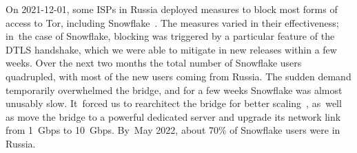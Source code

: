 \documentclass[letterpaper,twocolumn]{article}
\begin{document}
On \mbox{2021-12-01}, some ISPs in Russia
deployed measures to block
most forms of access to Tor,
including Snowflake~\cite{ooni-2021-russia-blocks-tor}.
The measures varied in their effectiveness;
in~the case of Snowflake,
blocking was triggered by a particular feature of the DTLS handshake,
which we were able to mitigate in new releases within a few weeks.
Over the next two months the total number of Snowflake users quadrupled,
with most of the new users coming from Russia.
The sudden demand temporarily overwhelmed the bridge, and
for a few weeks Snowflake was almost unusably slow.
It~forced us to rearchitect the bridge for better scaling~\cite{Fifield2023a},
as~well as move the bridge to a powerful dedicated server
and upgrade its network link from 1~Gbps to 10~Gbps.
By~May 2022,
about 70\% of Snowflake users were in Russia.
\end{document}
